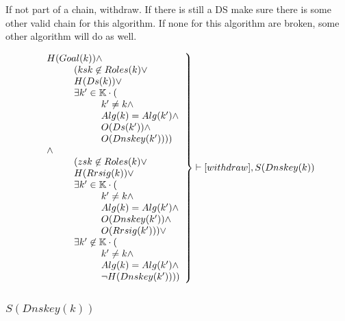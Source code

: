 \documentclass[twoside,english, a4paper]{article}
\newcommand{\mathbox}[1]{#1}
\begin{document}
\mathbox{

	If not part of a chain, withdraw. If there is still a DS make sure 
	there is some other valid chain for this algorithm. If none for 
	this algorithm are broken, some other algorithm will do as well.
	
	
	
	\begin{equation}
		\left.
		\begin{array}{l}
			H(Goal(k)) \wedge \\
\hskip 1cm	(ksk \not \in Roles(k) \vee\\
\hskip 1cm		H(Ds(k)) \vee \\
\hskip 1cm		\exists k' \in \mathbb{K} \cdot (\\
\hskip 2cm			k' \not = k \wedge \\
\hskip 2cm			Alg(k)=Alg(k') \wedge \\
\hskip 2cm			O(Ds(k')) \wedge \\
\hskip 2cm			O(Dnskey(k')))) \\
\hskip 0cm	\wedge \\
\hskip 1cm		(zsk \not \in Roles(k) \vee \\
\hskip 1cm		H(Rrsig(k)) \vee \\
\hskip 1cm		\exists k' \in \mathbb{K} \cdot (\\
\hskip 2cm			k' \not = k \wedge \\
\hskip 2cm			Alg(k)=Alg(k') \wedge \\
\hskip 2cm			O(Dnskey(k')) \wedge \\
\hskip 2cm			O(Rrsig(k'))) \vee \\
\hskip 1cm		\exists k' \not \in \mathbb{K} \cdot (\\
\hskip 2cm			k' \not = k \wedge\\
\hskip 2cm			Alg(k)=Alg(k') \wedge \\
\hskip 2cm			\neg H(Dnskey(k'))))\\
		\end{array}
		\right\} \vdash [withdraw], S(Dnskey(k))
	\end{equation}
}


\subsubsection{$S(Dnskey(k))$}
\end{document}
